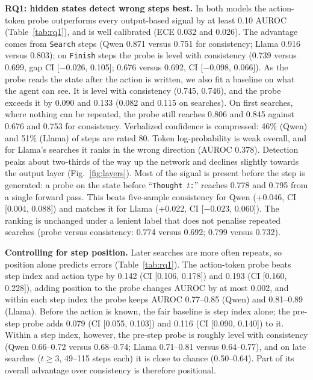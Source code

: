 \documentclass[10pt,twocolumn]{article}
\begin{document}
\textbf{RQ1: hidden states detect wrong steps best.} In both models the action-token probe outperforms every
output-based signal by at least 0.10 AUROC (Table~\ref{tab:rq1}), and is well calibrated (ECE 0.032 and 0.026). The
advantage comes from \texttt{Search} steps (Qwen 0.871 versus 0.751 for consistency; Llama 0.916 versus 0.803); on
\texttt{Finish} steps the probe is level with consistency (0.739 versus 0.699, gap CI [$-0.026$, 0.105]; 0.676
versus 0.692, CI [$-0.098$, 0.066]). As the probe reads the state after the action is written, we also fit a
baseline on what the agent can see. It is level with consistency (0.745, 0.746), and the probe exceeds it by 0.090
and 0.133 (0.082 and 0.115 on searches). On first searches, where nothing can be repeated, the probe still reaches
0.806 and 0.845 against 0.676 and 0.753 for consistency. Verbalized
confidence is compressed: 46\% (Qwen) and 51\% (Llama) of steps are rated 80. Token log-probability is weak
overall, and for Llama's searches it ranks in the wrong direction (AUROC 0.378). Detection peaks about two-thirds of the way
up the network and declines slightly towards the output layer (Fig.~\ref{fig:layers}). Most of the signal is present
before the step is generated: a probe on the state before ``\texttt{Thought $t$:}'' reaches 0.778 and 0.795 from a
single forward pass. This beats five-sample consistency for Qwen (+0.046, CI [0.004, 0.088]) and matches it for
Llama (+0.022, CI [$-0.023$, 0.060]). The ranking is unchanged under a lenient label that does not penalise repeated
searches (probe versus consistency: 0.774 versus 0.692; 0.799 versus 0.732).

\textbf{Controlling for step position.} Later searches are more often repeats, so position alone predicts errors
(Table~\ref{tab:rq1}). The action-token probe beats step index and action type by 0.142 (CI
[0.106, 0.178]) and 0.193 (CI [0.160, 0.228]), adding position to the probe changes AUROC by at most 0.002, and
within each step index the probe keeps AUROC 0.77--0.85 (Qwen) and 0.81--0.89 (Llama). Before the action is known,
the fair baseline is step index alone; the pre-step probe adds 0.079 (CI [0.055, 0.103]) and 0.116 (CI [0.090,
0.140]) to it. Within a step index, however, the pre-step probe is roughly level with consistency (Qwen 0.66--0.72
versus 0.68--0.74; Llama 0.71--0.81 versus 0.64--0.77), and on late searches ($t\ge3$, 49--115 steps each) it is
close to chance (0.50--0.64). Part of its overall advantage over consistency is therefore positional.
\end{document}
